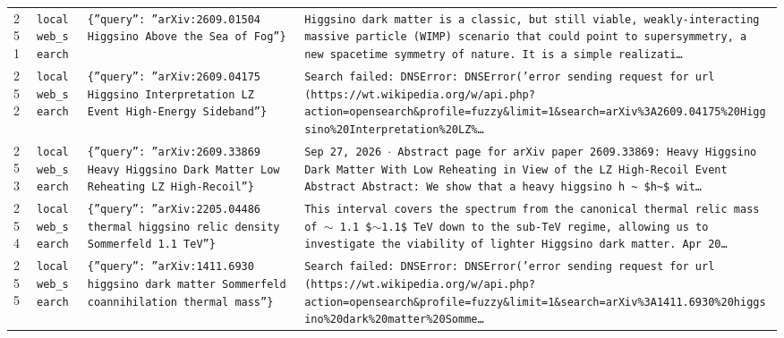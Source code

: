 \documentclass[11pt,a4paper]{article}
\begin{document}
\begin{longtable}{@{}p{}p{}p{}p{}@{}}
251 & \texttt{local}\newline\texttt{web\_\allowbreak{}search} & \texttt{\{''query'':\allowbreak{} ''arXiv:\allowbreak{}2609.01504 Higgsino Above the Sea of Fog''\}\allowbreak{}} & \texttt{Higgsino dark matter is a classic,\allowbreak{} but still viable,\allowbreak{} weakly-interacting massive particle (WIMP)\allowbreak{} scenario that could point to supersymmetry,\allowbreak{} a new spacetime symmetry of nature. It is a simple realizati\ldots{}\allowbreak{}} \\
252 & \texttt{local}\newline\texttt{web\_\allowbreak{}search} & \texttt{\{''query'':\allowbreak{} ''arXiv:\allowbreak{}2609.04175 Higgsino Interpretation LZ Event High-Energy Sideband''\}\allowbreak{}} & \texttt{Search failed:\allowbreak{} DNSError:\allowbreak{} DNSError('error sending request for url (https:\allowbreak{}/\allowbreak{}/\allowbreak{}wt.wikipedia.org/\allowbreak{}w/\allowbreak{}api.php?action=\allowbreak{}opensearch\&profile=\allowbreak{}fuzzy\&limit=\allowbreak{}1\&search=\allowbreak{}arXiv\%3A2609.04175\%20Higgsino\%20Interpretation\%20LZ\%\ldots{}\allowbreak{}} \\
253 & \texttt{local}\newline\texttt{web\_\allowbreak{}search} & \texttt{\{''query'':\allowbreak{} ''arXiv:\allowbreak{}2609.33869 Heavy Higgsino Dark Matter Low Reheating LZ High-Recoil''\}\allowbreak{}} & \texttt{Sep 27,\allowbreak{} 2026 $\cdot$ Abstract page for arXiv paper 2609.33869:\allowbreak{} Heavy Higgsino Dark Matter With Low Reheating in View of the LZ High-Recoil Event Abstract Abstract:\allowbreak{} We show that a heavy higgsino h \textasciitilde{}\allowbreak{} \$h\textasciitilde{}\allowbreak{}\$ wit\ldots{}\allowbreak{}} \\
254 & \texttt{local}\newline\texttt{web\_\allowbreak{}search} & \texttt{\{''query'':\allowbreak{} ''arXiv:\allowbreak{}2205.04486 thermal higgsino relic density Sommerfeld 1.1 TeV''\}\allowbreak{}} & \texttt{This interval covers the spectrum from the canonical thermal relic mass of $\sim$ 1.1 \$$\sim$1.1\$ TeV down to the sub-TeV regime,\allowbreak{} allowing us to investigate the viability of lighter Higgsino dark matter. Apr 20\ldots{}\allowbreak{}} \\
255 & \texttt{local}\newline\texttt{web\_\allowbreak{}search} & \texttt{\{''query'':\allowbreak{} ''arXiv:\allowbreak{}1411.6930 higgsino dark matter Sommerfeld coannihilation thermal mass''\}\allowbreak{}} & \texttt{Search failed:\allowbreak{} DNSError:\allowbreak{} DNSError('error sending request for url (https:\allowbreak{}/\allowbreak{}/\allowbreak{}wt.wikipedia.org/\allowbreak{}w/\allowbreak{}api.php?action=\allowbreak{}opensearch\&profile=\allowbreak{}fuzzy\&limit=\allowbreak{}1\&search=\allowbreak{}arXiv\%3A1411.6930\%20higgsino\%20dark\%20matter\%20Somme\ldots{}\allowbreak{}} \\

\end{longtable}
\end{document}
